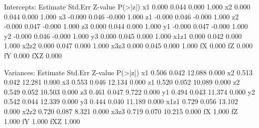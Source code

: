 \begin{Schunk}
\begin{Soutput}
Intercepts:
                   Estimate  Std.Err  Z-value  P(>|z|)
    x1                0.000    0.044    0.000    1.000
    x2                0.000    0.044    0.000    1.000
    x3               -0.000    0.046   -0.000    1.000
    z1               -0.000    0.046   -0.000    1.000
    z2               -0.000    0.047   -0.000    1.000
    z3                0.000    0.044    0.000    1.000
    y1               -0.000    0.047   -0.000    1.000
    y2               -0.000    0.046   -0.000    1.000
    y3                0.000    0.045    0.000    1.000
    x1z1              0.000    0.042    0.000    1.000
    x2z2              0.000    0.047    0.000    1.000
    x3z3              0.000    0.045    0.000    1.000
    fX                0.000                           
    fZ                0.000                           
    fY                0.000                           
    fXZ               0.000                           

Variances:
                   Estimate  Std.Err  Z-value  P(>|z|)
    x1                0.506    0.042   12.088    0.000
    x2                0.513    0.042   12.281    0.000
    x3                0.553    0.046   12.134    0.000
    z1                0.520    0.052   10.089    0.000
    z2                0.549    0.052   10.503    0.000
    z3                0.461    0.047    9.722    0.000
    y1                0.494    0.043   11.374    0.000
    y2                0.542    0.044   12.339    0.000
    y3                0.444    0.040   11.189    0.000
    x1z1              0.729    0.056   13.102    0.000
    x2z2              0.720    0.087    8.321    0.000
    x3z3              0.719    0.070   10.215    0.000
    fX                1.000                           
    fZ                1.000                           
    fY                1.000                           
    fXZ               1.000                           
\end{Soutput}
\end{Schunk}
